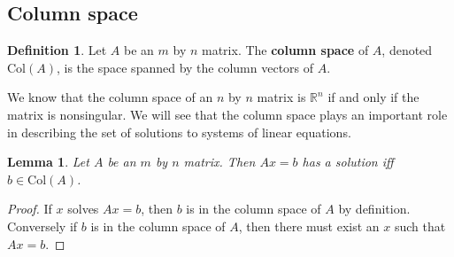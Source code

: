 \documentclass[12pt,reqno]{amsart}
\newtheorem{lemma}{Lemma}[section]
\theoremstyle{definition}
\newtheorem{definition}{Definition}[section]
\def\R{\mathbb{R}}
\newcommand{\col}{\mathrm{Col}}
\begin{document}
\subsection{Column space}

\begin{definition}
  Let $A$ be an $m$ by $n$ matrix. The \textbf{column space} of $A$,
  denoted $\col(A)$, is the space spanned by the column vectors of
  $A$.
\end{definition}
We know that the column space of an $n$ by $n$ matrix is $\R^n$ if and
only if the matrix is nonsingular. We will see that the column space
plays an important role in describing the set of solutions to systems
of linear equations.
\begin{lemma}
  Let $A$ be an $m$ by $n$ matrix. Then $A x = b$ has a solution iff $b
  \in \col(A)$.
\end{lemma}
\begin{proof}
  If $x$ solves $Ax = b$, then $b$ is in the column space of $A$ by
  definition. Conversely if $b$ is in the column space of $A$, then
  there must exist an $x$ such that $A x=  b$.
\end{proof}
\end{document}
